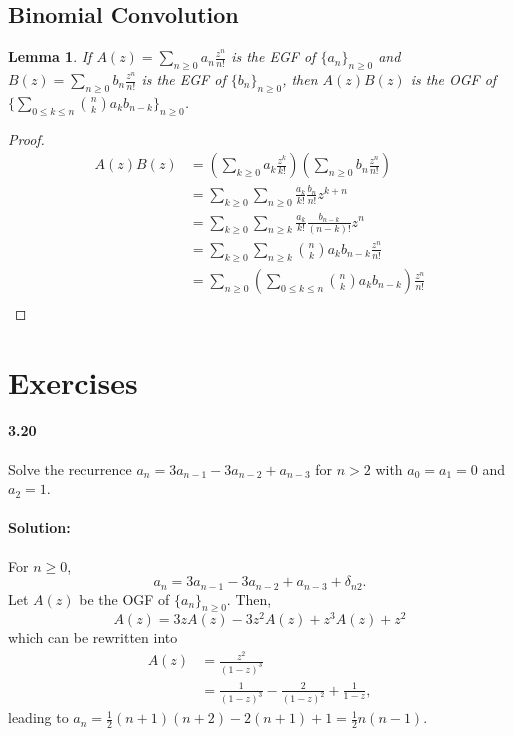 \documentclass{article}
\newtheorem{lemma}{Lemma}
\begin{document}
\subsection{Binomial Convolution}

\begin{lemma}
  If $A(z) = \sum_{n \geq 0}a_n\frac{z^n}{n!}$ is the EGF of $\{a_n\}_{n \geq
  0}$ and $B(z) = \sum_{n \geq 0}b_n\frac{z^n}{n!}$ is the EGF of $\{b_n\}_{n
  \geq 0}$, then $A(z)B(z)$ is the OGF of $\{\sum_{0 \leq k \leq n}\binom{n}{k}
  a_kb_{n - k}\}_{n \geq 0}$.
\end{lemma}

\begin{proof}
  \begin{align*}
    A(z)B(z) &= \left(\sum_{k \geq 0} a_k\frac{z^k}{k!}\right) \left(\sum_{n
      \geq 0} b_n\frac{z^n}{n!}\right) \\
      &= \sum_{k \geq 0} \sum_{n \geq 0} \frac{a_k}{k!}\frac{b_n}{n!}z^{k + n}
        \\
      &= \sum_{k \geq 0} \sum_{n \geq k} \frac{a_k}{k!}\frac{b_{n - k}}{(n -
      k)!}z^n \\
      &= \sum_{k \geq 0} \sum_{n \geq k} \binom{n}{k} a_kb_{n - k}
        \frac{z^n}{n!} \\
      &= \sum_{n \geq 0} \left(\sum_{0 \leq k \leq n} \binom{n}{k} a_kb_{n -
        k}\right) \frac{z^n}{n!} \\
  \end{align*}
\end{proof}

\section*{Exercises}

\paragraph{3.20} Solve the recurrence $a_n = 3a_{n - 1} - 3a_{n - 2} + a_{n -
3}$ for $n > 2$ with $a_0 = a_1 = 0$ and $a_2 = 1$.

\paragraph{Solution:} For $n \geq 0$, \begin{equation*}
  a_n = 3a_{n - 1} - 3a_{n - 2} + a_{n - 3} + \delta_{n2}.
\end{equation*} Let $A(z)$ be the OGF of $\{a_n\}_{n \geq 0}$. Then,
\begin{equation*}
  A(z) = 3zA(z) - 3z^2A(z) + z^3A(z) + z^2
\end{equation*} which can be rewritten into \begin{align*}
  A(z) &= \frac{z^2}{(1 - z)^3} \\
    &= \frac{1}{(1 - z)^3} - \frac{2}{(1 - z)^2} + \frac{1}{1 - z},
\end{align*} leading to $a_n = \frac{1}{2}(n + 1)(n + 2) - 2(n + 1) + 1 =
\frac{1}{2}n(n - 1)$.
\end{document}
